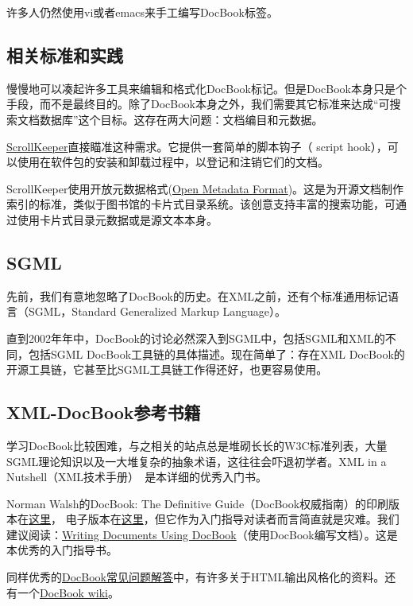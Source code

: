 \documentclass[12pt,oneside]{ctexbook}
\begin{document}
\begin{common-format}
许多人仍然使用vi或者emacs来手工编写DocBook标签。

\subsection{相关标准和实践}
慢慢地可以凑起许多工具来编辑和格式化DocBook标记。但是DocBook本身只是个手段，而不是最终目的。除了DocBook本身之外，我们需要其它标准来达成“可搜索文档数据库”这个目标。这存在两大问题：文档编目和元数据。

\href{http://scrollkeeper.sourceforge.net/}{ScrollKeeper}直接瞄准这种需求。它提供一套简单的脚本钩子（ script hook），可以使用在软件包的安装和卸载过程中，以登记和注销它们的文档。

ScrollKeeper使用开放元数据格式(\href{http://www.ibiblio.org/osrt/omf/}{Open Metadata Format})。这是为开源文档制作索引的标准，类似于图书馆的卡片式目录系统。该创意支持丰富的搜索功能，可通过使用卡片式目录元数据或是源文本本身。

\subsection{SGML}
先前，我们有意地忽略了DocBook的历史。在XML之前，还有个标准通用标记语言（SGML，Standard Generalized Markup Language）。

直到2002年年中，DocBook的讨论必然深入到SGML中，包括SGML和XML的不同，包括SGML DocBook工具链的具体描述。现在简单了：存在XML DocBook的开源工具链，它甚至比SGML工具链工作得还好，也更容易使用。

\subsection{XML-DocBook参考书籍}
学习DocBook比较困难，与之相关的站点总是堆砌长长的W3C标准列表，大量SGML理论知识以及一大堆复杂的抽象术语，这往往会吓退初学者。XML in a Nutshell（XML技术手册）~\cite{Harold-Means}是本详细的优秀入门书。

Norman Walsh的DocBook: The Definitive Guide（DocBook权威指南）的印刷版本在\href{http://www.oreilly.com/catalog/docbook/}{这里}，  电子版本在\href{http://www.docbook.org/tdg/en/html/docbook.html}{这里}，但它作为入门指导对读者而言简直就是灾难。我们建议阅读：\href{http://xml.web.cern.ch/XML/goossens/dbatcern/}{Writing Documents Using DocBook}（使用DocBook编写文档）。这是本优秀的入门指导书。

同样优秀的\href{http://www.dpawson.co.uk/docbook/}{DocBook常见问题解答}中，有许多关于HTML输出风格化的资料。还有一个\href{http://docbook.org/wiki/moin.cgi}{DocBook wiki}。


\end{common-format}
\end{document}
